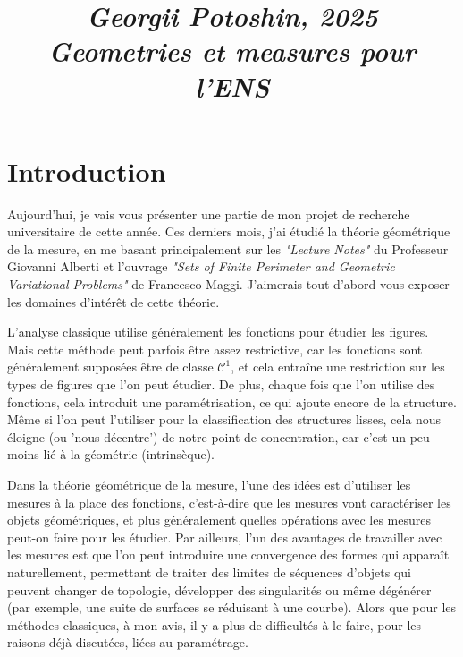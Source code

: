 \documentclass{article}
\begin{document}
\title{
\vspace{-1cm}
\textit{\small{Georgii Potoshin, 2025}}\\
\vspace{0.3ex}
\textit{\huge{Geometries et measures pour l'ENS }}\vspace{1ex}
}
\date{\vspace{-5ex}}
\maketitle

\section{Introduction}
Aujourd'hui, je vais vous présenter une partie de mon projet de recherche
universitaire de cette année. Ces derniers mois, j'ai étudié la théorie
géométrique de la mesure, en me basant principalement sur les \textit{"Lecture
Notes"} du Professeur Giovanni Alberti et l'ouvrage \textit{"Sets of Finite
Perimeter and Geometric Variational Problems"} de Francesco Maggi. J'aimerais
tout d'abord vous exposer les domaines d'intérêt de cette théorie.

\vspace{1ex}
L'analyse classique utilise généralement les fonctions pour étudier les figures.
Mais cette méthode peut parfois être assez restrictive, car les fonctions sont
généralement supposées être de classe $\mathcal C^1$, et cela entraîne une
restriction sur les types de figures que l'on peut étudier. De plus, chaque
fois que l'on utilise des fonctions, cela introduit une paramétrisation, ce qui
ajoute encore de la structure. Même si l'on peut l'utiliser pour la
classification des structures lisses, cela nous éloigne (ou 'nous décentre') de
notre point de concentration, car c'est un peu moins lié à la géométrie
(intrinsèque).

\vspace{1ex}
Dans la théorie géométrique de la mesure, l'une des idées est d'utiliser les
mesures à la place des fonctions, c'est-à-dire que les mesures vont caractériser
les objets géométriques, et plus généralement quelles opérations avec les
mesures peut-on faire pour les étudier.
Par ailleurs, l'un des avantages de travailler avec les mesures est que l'on
peut introduire une convergence des formes qui apparaît naturellement,
permettant de traiter des limites de séquences d'objets qui peuvent changer de
topologie, développer des singularités ou même dégénérer (par exemple, une
suite de surfaces se réduisant à une courbe). Alors que pour les méthodes
classiques, à mon avis, il y a plus de difficultés à le faire, pour les raisons
déjà discutées, liées au paramétrage.
\end{document}
